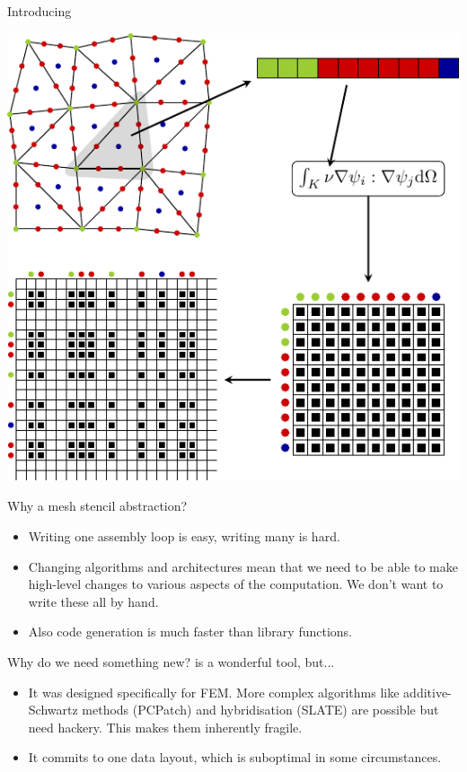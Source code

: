 \documentclass[aspectratio=169]{beamer}
\begin{document}
\begin{frame}{Introducing }
  \vspace{-2em}
  \begin{center}
    \includegraphics[scale=.9]{fem_assembly.pdf}
  \end{center}
\end{frame}

\begin{frame}{Why a mesh stencil abstraction?}
  \begin{itemize}
    \item 
      Writing one assembly loop is easy, writing many is hard.
    \item
      Changing algorithms and architectures mean that we need to be able to make high-level changes to various aspects of the computation.
      We don't want to write these all by hand.
    \item
      Also code generation is much faster than library functions.
  \end{itemize}
\end{frame}

\begin{frame}{Why do we need something new?}
   is a wonderful tool, but...

  \begin{itemize}
    \item
      It was designed specifically for FEM.
      More complex algorithms like additive-Schwartz methods (PCPatch) and hybridisation (SLATE) are possible but need hackery.
      This makes them inherently fragile.
    \pause
    \item
      It commits to one data layout, which is suboptimal in some circumstances.
  \end{itemize}
\end{frame}
\end{document}
